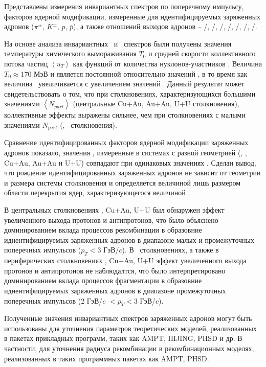 Представлены измерения инвариантных спектров по поперечному импульсу, факторов ядерной модификации, измеренные для идентифицируемых заряженных адронов ($\pi^\pm$, $K^\pm$, $p$, $\bar{p}$), а также отношений выходов адронов -- \pim/\pip, \Km/\Kp, \prot/\aprot, \prot/\pip, \aprot/\pim, \Kp/\pip, \Km/\pim.

На основе анализа инвариантных \pt \ и \mt \ спектров были получены значения температуры химического вымораживания $T_{0}$ и средней скорости коллективного потока частиц $\left< u_T \right>$ как функций от количества нуклонов-участников \Npart.
Величина $T_{0}\approx170$ МэВ и является постоянной относительно значений \Npart, в то время как величина \ut \ увеличивается с увеличением значений \Npart. Данный результат может свидетельствовать о том, что при столкновениях, характеризующихся большими значениями $\left<N_{part}\right>$ (центральные Cu+Au, Au+Au, U+U столкновения), коллективные эффекты выражены сильнее, чем при столкновениях с малыми значениями $N_{part}$ (\pal, \heau \ столкновения).

Сравнение идентифицированных факторов ядерной модификации заряженных адронов показало, значения \rab, измеренные в системах с разной геометрией (\dau, \heau, Cu+Au, Au+Au и U+U) совпадают при одинаковых значениях \Npart.
Сделан вывод, что рождение идентифицированных заряженных адронов не зависит от геометрии и размера системы столкновения и определяется величиной лишь размером области перекрытия ядер, характеризующегося величиной \Npart.

В центральных столкновениях \heau, Cu+Au, U+U был обнаружен эффект увеличенного выхода протонов и антипротонов, что было объяснено доминированием вклада процессов рекомбинации в образовние иднентифицируемых заряженных адронов в диапазоне малых и промежуточных поперечных импульсов ($p_{T}<3$ ГэВ/$c$). 
В \pal \ столкновениях, а также в периферических столкновениях \heau, Cu+Au, U+U эффект увеличенного выхода протонов и антипротонов не наблюдалтся, что было интерпретировано доминированием вклада процессов фрагментации в образовние иднентифицируемых заряженных адронов в диапазоне промежуточных поперечных импульсов (2 ГэВ/$c$ $<p_{T}<3$ ГэВ/$c$).

Полученные значения инвариантных спектров заряженных адронов могут быть использованы для уточнения параметров теоретических моделей, реализованных в пакетах прикладных программ, таких как  AMPT, HIJING, PHSD и др. В частности, для уточнения радиуса рекомбинации в рекомбинационных моделях, реализованных в таких программных пакетах как AMPT, PHSD.
